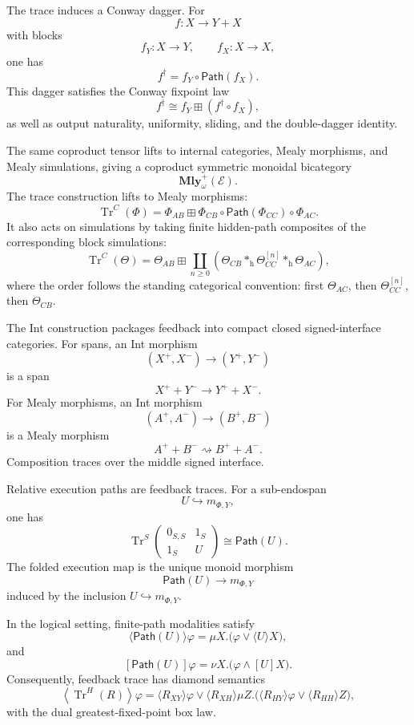 The trace induces a Conway dagger. For
\[
  f:X\to Y+X
\]
with blocks
\[
  f_Y:X\to Y,
  \qquad
  f_X:X\to X,
\]
one has
\[
  f^\dagger
  =
  f_Y\circ\mathsf{Path}(f_X).
\]
This dagger satisfies the Conway fixpoint law
\[
  f^\dagger
  \cong
  f_Y\boxplus(f^\dagger\circ f_X),
\]
as well as output naturality, uniformity, sliding, and the double-dagger
identity.

The same coproduct tensor lifts to internal categories, Mealy morphisms, and
Mealy simulations, giving a coproduct symmetric monoidal bicategory
\[
  \mathbf{Mly}^{+}_{\omega}(\mathcal E).
\]
The trace construction lifts to Mealy morphisms:
\[
  \operatorname{Tr}^{C}(\Phi)
  =
  \Phi_{AB}
  \boxplus
  \Phi_{CB}\circ
  \mathsf{Path}(\Phi_{CC})
  \circ
  \Phi_{AC}.
\]
It also acts on simulations by taking finite hidden-path composites of the
corresponding block simulations:
\[
  \operatorname{Tr}^{C}(\Theta)
  =
  \Theta_{AB}
  \boxplus
  \coprod_{n\geq 0}
  \left(
    \Theta_{CB}
    \ast_{\mathrm h}
    \Theta_{CC}^{[n]}
    \ast_{\mathrm h}
    \Theta_{AC}
  \right),
\]
where the order follows the standing categorical convention: first
\(\Theta_{AC}\), then \(\Theta_{CC}^{[n]}\), then \(\Theta_{CB}\).

The Int construction packages feedback into compact closed signed-interface
categories. For spans, an Int morphism
\[
  (X^+,X^-)\to(Y^+,Y^-)
\]
is a span
\[
  X^+ + Y^-\to Y^+ + X^-.
\]
For Mealy morphisms, an Int morphism
\[
  (A^+,A^-)\to(B^+,B^-)
\]
is a Mealy morphism
\[
  A^+ + B^-
  \rightsquigarrow
  B^+ + A^-.
\]
Composition traces over the middle signed interface.

Relative execution paths are feedback traces. For a sub-endospan
\[
  U\hookrightarrow m_{\Phi,Y},
\]
one has
\[
  \operatorname{Tr}^{S}
  \begin{pmatrix}
    0_{S,S} & 1_S\\
    1_S & U
  \end{pmatrix}
  \cong
  \mathsf{Path}(U).
\]
The folded execution map is the unique monoid morphism
\[
  \mathsf{Path}(U)\to m_{\Phi,Y}
\]
induced by the inclusion \(U\hookrightarrow m_{\Phi,Y}\).

In the logical setting, finite-path modalities satisfy
\[
  \langle\mathsf{Path}(U)\rangle\varphi
  =
  \mu X.
  \bigl(
    \varphi\vee\langle U\rangle X
  \bigr),
\]
and
\[
  [\mathsf{Path}(U)]\varphi
  =
  \nu X.
  \bigl(
    \varphi\wedge[U]X
  \bigr).
\]
Consequently, feedback trace has diamond semantics
\[
  \left\langle
    \operatorname{Tr}^{H}(R)
  \right\rangle\varphi
  =
  \langle R_{XY}\rangle\varphi
  \vee
  \langle R_{XH}\rangle
  \mu Z.
  \bigl(
    \langle R_{HY}\rangle\varphi
    \vee
    \langle R_{HH}\rangle Z
  \bigr),
\]
with the dual greatest-fixed-point box law.

